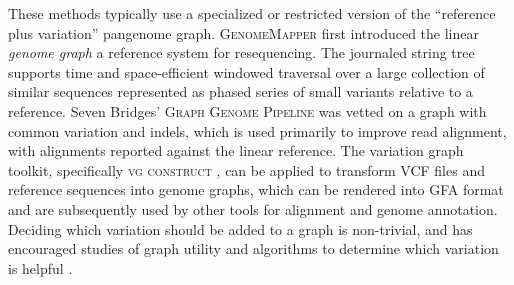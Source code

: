 These methods typically use a specialized or restricted version of the ``reference plus variation'' pangenome graph.
\textsc{GenomeMapper} \cite{Schneeberger_2009} first introduced the linear \emph{genome graph} a reference system for resequencing.
The journaled string tree \cite{Rahn_2014} supports time and space-efficient windowed traversal over a large collection of similar sequences represented as phased series of small variants relative to a reference.
Seven Bridges' \textsc{Graph Genome Pipeline} \cite{Rakocevic_2019} was vetted on a graph with common variation and indels, which is used primarily to improve read alignment, with alignments reported against the linear reference.
The variation graph toolkit, specifically \textsc{vg construct} \cite{Garrison_2018}, can be applied to transform VCF files and reference sequences into genome graphs, which can be rendered into GFA format and are subsequently used by other tools for alignment and genome annotation.
Deciding which variation should be added to a graph is non-trivial, and has encouraged studies of graph utility \cite{Novak_2017a} and algorithms to determine which variation is helpful \cite{Pritt_2018}.

